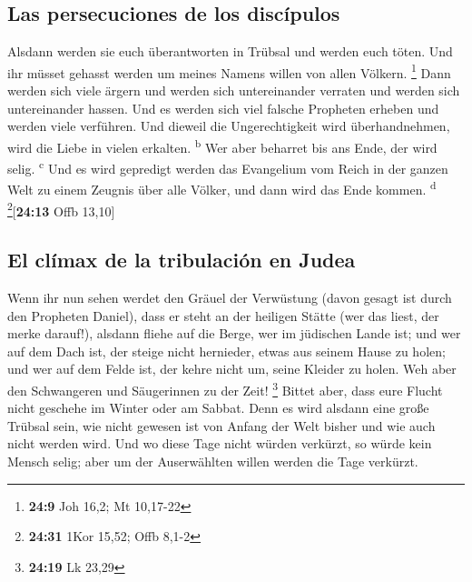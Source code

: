 \hypertarget{las-persecuciones-de-los-discuxedpulos}{%
\subsection{Las persecuciones de los
discípulos}\label{las-persecuciones-de-los-discuxedpulos}}

 Alsdann werden sie euch überantworten in Trübsal und
werden euch töten. Und ihr müsset gehasst werden um meines Namens willen
von allen Völkern. \footnote{\textbf{24:9} Joh 16,2; Mt 10,17-22}
 Dann werden sich viele ärgern und werden sich
untereinander verraten und werden sich untereinander hassen.
 Und es werden sich viel falsche Propheten erheben und
werden viele verführen.  Und dieweil die Ungerechtigkeit
wird überhandnehmen, wird die Liebe in vielen erkalten.
\textsuperscript{b}  Wer aber beharret bis ans Ende, der
wird selig. \textsuperscript{c}  Und es wird gepredigt
werden das Evangelium vom Reich in der ganzen Welt zu einem Zeugnis über
alle Völker, und dann wird das Ende kommen. \textsuperscript{d}
\footnote{\textbf{24:31} 1Kor 15,52; Offb 8,1-2}{[}\textbf{24:13} Offb
13,10{]}

\hypertarget{el-cluxedmax-de-la-tribulaciuxf3n-en-judea}{%
\subsection{El clímax de la tribulación en
Judea}\label{el-cluxedmax-de-la-tribulaciuxf3n-en-judea}}

 Wenn ihr nun sehen werdet den Gräuel der Verwüstung
(davon gesagt ist durch den Propheten Daniel), dass er steht an der
heiligen Stätte (wer das liest, der merke darauf!), 
alsdann fliehe auf die Berge, wer im jüdischen Lande ist;
 und wer auf dem Dach ist, der steige nicht hernieder,
etwas aus seinem Hause zu holen;  und wer auf dem Felde
ist, der kehre nicht um, seine Kleider zu holen.  Weh
aber den Schwangeren und Säugerinnen zu der Zeit! \footnote{\textbf{24:19}
  Lk 23,29}  Bittet aber, dass eure Flucht nicht geschehe
im Winter oder am Sabbat.  Denn es wird alsdann eine
große Trübsal sein, wie nicht gewesen ist von Anfang der Welt bisher und
wie auch nicht werden wird.  Und wo diese Tage nicht
würden verkürzt, so würde kein Mensch selig; aber um der Auserwählten
willen werden die Tage verkürzt.

